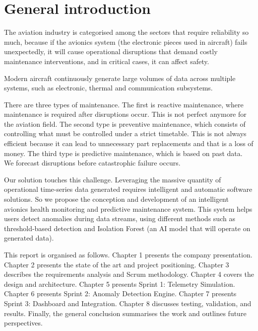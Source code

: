 \chapter*{General introduction}

The aviation industry is categorised among the sectors that require reliability so much, because if the avionics system (the electronic pieces used in aircraft) fails unexpectedly, it will cause operational disruptions that demand costly maintenance interventions, and in critical cases, it can affect safety.

Modern aircraft continuously generate large volumes of data across multiple systems, such as electronic, thermal and communication subsystems.

There are three types of maintenance. The first is reactive maintenance, where maintenance is required after disruptions occur. This is not perfect anymore for the aviation field. The second type is preventive maintenance, which consists of controlling what must be controlled under a strict timetable. This is not always efficient because it can lead to unnecessary part replacements and that is a loss of money. The third type is predictive maintenance, which is based on past data. We forecast disruptions before catastrophic failure occurs.

Our solution touches this challenge. Leveraging the massive quantity of operational time-series data generated requires intelligent and automatic software solutions. So we propose the conception and development of an intelligent avionics health monitoring and predictive maintenance system. This system helps users detect anomalies during data streams, using different methods such as threshold-based detection and Isolation Forest (an AI model that will operate on generated data).

This report is organised as follows. Chapter 1 presents the company presentation. Chapter 2 presents the state of the art and project positioning. Chapter 3 describes the requirements analysis and Scrum methodology. Chapter 4 covers the design and architecture. Chapter 5 presents Sprint 1: Telemetry Simulation. Chapter 6 presents Sprint 2: Anomaly Detection Engine. Chapter 7 presents Sprint 3: Dashboard and Integration. Chapter 8 discusses testing, validation, and results. Finally, the general conclusion summarises the work and outlines future perspectives.
